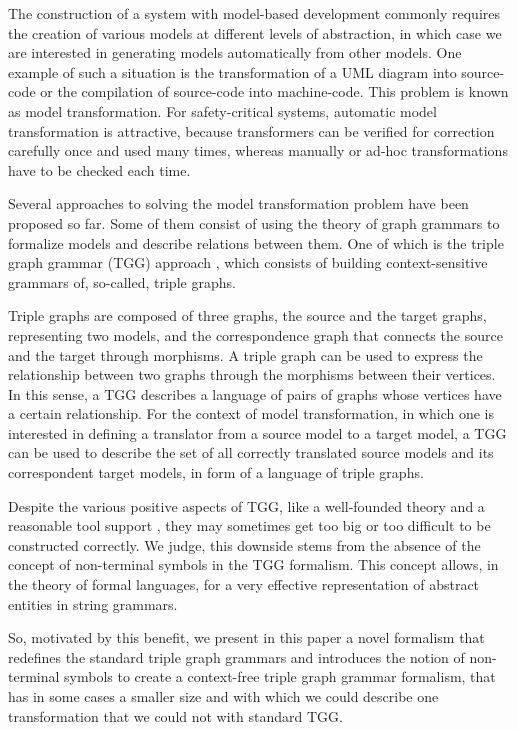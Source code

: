 \documentclass[runningheads]{llncs}
\begin{document}
The construction of a system with model-based development commonly requires the creation of various models at different levels of abstraction, in which case we are interested in generating models automatically from other models. One example of such a situation is the transformation of a UML diagram into source-code or the compilation of source-code into machine-code. This problem is known as model transformation. For safety-critical systems, automatic model transformation is attractive, because transformers can be verified for correction carefully once and used many times, whereas manually or ad-hoc transformations have to be checked each time.

Several approaches to solving the model transformation problem have been proposed so far. Some of them consist of using the theory of graph grammars to formalize models and describe relations between them. One of which is the triple graph grammar (TGG) approach \cite{schurr1994specification}, which consists of building context-sensitive grammars of, so-called, triple graphs.

Triple graphs are composed of three graphs, the source and the target graphs, representing two models, and the correspondence graph that connects the source and the target through morphisms. A triple graph can be used to express the relationship between two graphs through the morphisms between their vertices. In this sense, a TGG describes a language of pairs of graphs whose vertices have a certain relationship. For the context of model transformation, in which one is interested in defining a translator from a source model to a target model, a TGG can be used to describe the set of all correctly translated source models and its correspondent target models, in form of a language of triple graphs.

Despite the various positive aspects of TGG, like a well-founded theory and a reasonable tool support \cite{anjorin201620}, they may sometimes get too big or too difficult to be constructed correctly. We judge, this downside stems from the absence of the concept of non-terminal symbols in the TGG formalism. This concept allows, in the theory of formal languages, for a very effective representation of abstract entities in string grammars.

So, motivated by this benefit, we present in this paper a novel formalism that redefines the standard triple graph grammars and introduces the notion of non-terminal symbols to create a context-free triple graph grammar formalism, that has in some cases a smaller size and with which we could describe one transformation that we could not with standard TGG.
\end{document}
